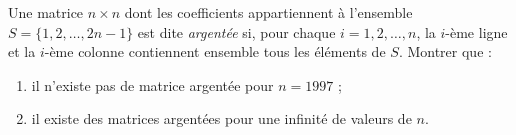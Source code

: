 Une matrice $n \times n$ dont les coefficients appartiennent à l'ensemble $S = \{1, 2, \dots, 2n-1\}$ est dite \emph{argentée} si, pour chaque $i = 1, 2, \dots, n$, la $i$-ème ligne et la $i$-ème colonne contiennent ensemble tous les éléments de $S$. Montrer que :
\begin{enumerate}
\item il n'existe pas de matrice argentée pour $n = 1997$ ;
\item il existe des matrices argentées pour une infinité de valeurs de $n$.
\end{enumerate}
